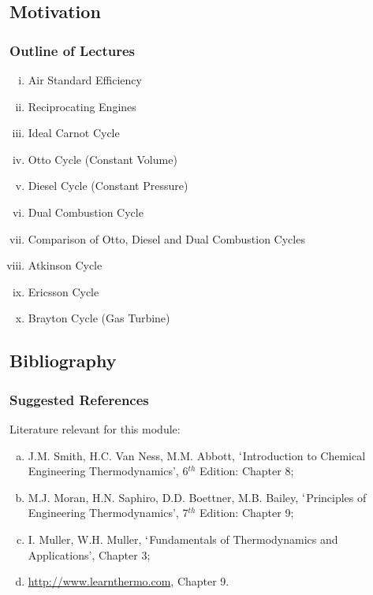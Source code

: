 \documentclass[10pt,compress]{beamer}
\begin{document}
\subsection{Motivation}
\begin{frame}
 \frametitle{Outline of Lectures}
 \begin{enumerate}[(i)]
  \item <1-> Air Standard Efficiency
  \item <2-> Reciprocating Engines
  \item <3-> Ideal Carnot Cycle
  \item <4-> Otto Cycle (Constant Volume)
  \item <5-> Diesel Cycle (Constant Pressure)
  \item <6-> Dual Combustion Cycle
  \item <7-> Comparison of Otto, Diesel and Dual Combustion Cycles
  \item <8-> Atkinson Cycle
  \item <9-> Ericsson Cycle
  \item <10-> Brayton Cycle (Gas Turbine)
 \end{enumerate}
\end{frame}
 
\subsection{Bibliography} 
\begin{frame}
 \frametitle{Suggested References}
  Literature relevant for this module:
  \begin{enumerate}[(a)]
   \item J.M. Smith, H.C. Van Ness, M.M. Abbott, $\lq$Introduction to Chemical Engineering Thermodynamics', 6$^{th}$ Edition: Chapter 8;
   \item  M.J. Moran, H.N. Saphiro, D.D. Boettner, M.B. Bailey, $\lq$Principles of Engineering Thermodynamics',  7$^{th}$ Edition: Chapter 9;
   \item I. Muller, W.H. Muller, $\lq$Fundamentals of Thermodynamics and Applications', Chapter 3;
   \item \href{http://www.learnthermo.com}{http://www.learnthermo.com}, Chapter 9.
  \end{enumerate}
\end{frame}
\end{document}
